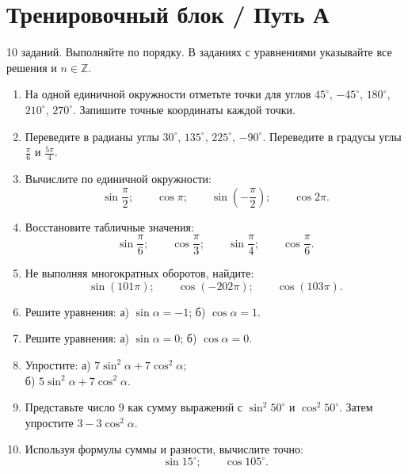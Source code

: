 \documentclass[a4paper,12pt]{article}
\newcommand{\dd}{^{\circ}}
\begin{document}
\section*{Тренировочный блок / Путь А}
\textcolor{softgray}{10 заданий. Выполняйте по порядку. В заданиях с уравнениями указывайте все решения и $n\in\mathbb Z$.}
\begin{enumerate}[label=\textcolor{darkaccent}{\bfseries\arabic*.},leftmargin=12mm,itemsep=11pt]
\item На одной единичной окружности отметьте точки для углов $45\dd$, $-45\dd$, $180\dd$, $210\dd$, $270\dd$. Запишите точные координаты каждой точки.
\item Переведите в радианы углы $30\dd$, $135\dd$, $225\dd$, $-90\dd$. Переведите в градусы углы $\frac\pi6$ и $\frac{5\pi}{4}$.
\item Вычислите по единичной окружности:
\[\sin\frac\pi2;\qquad \cos\pi;\qquad \sin\left(-\frac\pi2\right);\qquad \cos2\pi.\]
\item Восстановите табличные значения:
\[\sin\frac\pi6;\qquad \cos\frac\pi3;\qquad \sin\frac\pi4;\qquad \cos\frac\pi6.\]
\item Не выполняя многократных оборотов, найдите:
\[\sin(101\pi);\qquad \cos(-202\pi);\qquad \cos(103\pi).\]
\item Решите уравнения: \quad а) $\sin\alpha=-1$; \quad б) $\cos\alpha=1$.
\item Решите уравнения: \quad а) $\sin\alpha=0$; \quad б) $\cos\alpha=0$.
\item Упростите: \quad а) $7\sin^2\alpha+7\cos^2\alpha$;\\
\hspace*{20mm}б) $5\sin^2\alpha+7\cos^2\alpha$.
\item Представьте число $9$ как сумму выражений с $\sin^2 50\dd$ и $\cos^2 50\dd$. Затем упростите $3-3\cos^2\alpha$.
\item Используя формулы суммы и разности, вычислите точно:
\[\sin15\dd;\qquad \cos105\dd.\]
\end{enumerate}

\clearpage
\end{document}
